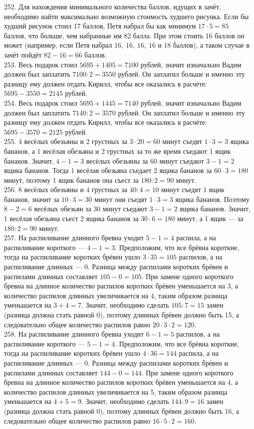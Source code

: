 252. Для нахождения минимального количества баллов, идущих в зачёт, необходимо найти максимально возможную стоимость худшего рисунка. Если бы худший рисунок стоил 17 баллов, Петя набрал бы как минимум $17\cdot5=85$ баллов, что больше, чем набранные им 82 балла. При этом стоить 16 баллов он может (например, если Петя набрал $16,\ 16,\ 16,\ 16$ и 18 баллов), а таком случае в зачёт пойдёт $82-16=66$ баллов.\\
253. Весь подарок стоил $5695+1405=7100$ рублей, значит изначально Вадим должен был заплатить $7100:2=3550$ рублей. Он заплатил больше и именно эту разницу ему должен отдать Кирилл, чтобы все оказались в расчёте: $5695-3550=2145$ рублей.\\
254. Весь подарок стоил $5695+1445=7140$ рублей, значит изначально Вадим должен был заплатить $7140:2=3570$ рублей. Он заплатил больше и именно эту разницу ему должен отдать Кирилл, чтобы все оказались в расчёте: $5695-3570=2125$ рублей.\\
255. 4 весёлых обезьяны и 2 грустных за $3\cdot20=60$ минут съедят $1\cdot3=3$ ящика бананов, а 1 весёлая обезьяна и 2 грустных за то же время съедают 1 ящик бананов. Значит, $4-1=3$ весёлых обезьяны за 60 минут съедают $3-1=2$ ящика бананов. Тогда 1 весёлая обезьяна съедает 2 ящика бананов за $60\cdot3=180$ минут, поэтому 1 ящик бананов она съест за $180:2=90$ минут.\\
256. 8 весёлых обезьяны и 4 грустных за $40:4=10$ минут съедят 1 ящик бананов, значит за $10\cdot3=30$ минут они съедят $1\cdot3=3$ ящика бананов. Поэтому $8-2=6$ весёлых обезьян за 30 минут съедают $3-1=2$ ящика бананов. Значит, 1 весёлая обезьяна съест 2 ящика бананов за $30\cdot6=180$ минут, а 1 ящик --- за $180:2=90$ минут.\\
257. На распиливание длинного бревна уходит $5-1=4$ распила, а на распиливание короткого --- $4-1=3.$ Предположим, что все брёвна короткие, тогда на распиливание коротких брёвен ушло $3\cdot35=105$ распилов, а на распиливание длинных --- 0. Разница между распилами коротких брёвен и распилами длинных составляет $105-0=105.$ При замене одного короткого бревна на длинное количество распилов коротких брёвен уменьшается на 3, а количество распилов длинных увеличивается на 4, таким образом разница уменьшается на $3+4=7.$ Значит, необходимо сделать $105:7=15$ замен (разница должна стать равной 0), поэтому длинных брёвен должно быть 15, а следовательно общее количество распилов равно $20\cdot3\cdot2=120.$\\
258. На распиливание длинного бревна уходит $6-1=5$ распилов, а на распиливание короткого --- $5-1=4.$ Предположим, что все брёвна короткие, тогда на распиливание коротких брёвен ушло $4\cdot36=144$ распила, а на распиливание длинных --- 0. Разница между распилами коротких брёвен и распилами длинных составляет $144-0=144.$ При замене одного короткого бревна на длинное количество распилов коротких брёвен уменьшается на 4, а количество распилов длинных увеличивается на 5, таким образом разница уменьшается на $4+5=9.$ Значит, необходимо сделать $144:9=16$ замен (разница должна стать равной 0), поэтому длинных брёвен должно быть 16, а следовательно общее количество распилов равно $16\cdot5\cdot2=160.$\\
